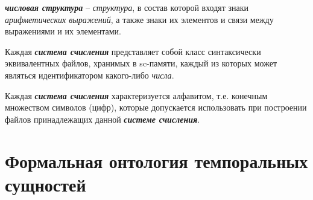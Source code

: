 %	
%	
%	
\begin{SCn}
\end{SCn}

\textbf{\textit{числовая структура}} -- \textit{структура}, в состав которой входят знаки \textit{арифметических выражений}, а также знаки их элементов и связи между выражениями и их элементами.
	
\begin{SCn}
\end{SCn}

Каждая \textbf{\textit{система счисления}} представляет собой класс синтаксически эквивалентных файлов, хранимых в sc-памяти, каждый из которых может являться идентификатором какого-либо \textit{числа}.
		
Каждая \textbf{\textit{система счисления}} характеризуется алфавитом, т.е. конечным множеством символов (цифр), которые допускается использовать при построении файлов принадлежащих данной \textbf{\textit{системе счисления}}.
	
%	
%	
	
\section{Формальная онтология темпоральных сущностей}
		
